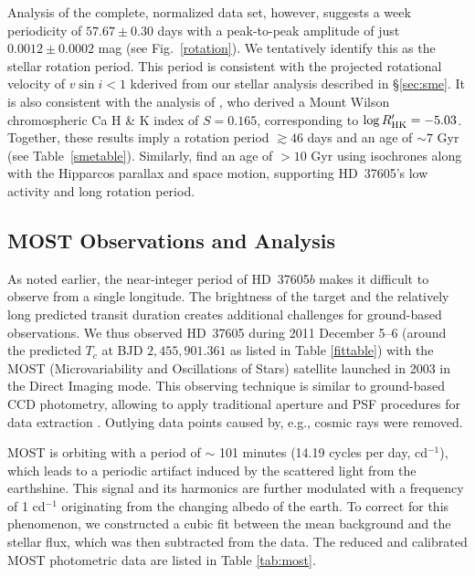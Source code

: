 Analysis of the complete, normalized data set, however, suggests a week 
periodicity of $57.67 \pm 0.30$ days with a peak-to-peak amplitude of just 
$0.0012 \pm 0.0002$ mag (see Fig.~\ref{rotation}).  We tentatively 
identify this as the stellar rotation period.  This period is consistent 
with the projected rotational velocity of $v\sin{i} < 1$ k\mps derived 
from our stellar analysis described in \S \ref{sec:sme}.  It is also 
consistent with the analysis of \cite{svalue2010}, who derived a Mount Wilson
chromospheric Ca {} H \& K index of $S=0.165$, corresponding to
$\log R^\prime_{\rm HK} = -5.03$.  Together, these results imply a
rotation period $\gtrsim 46$ days and an age of $\sim 7$ Gyr (see 
Table~\ref{smetable}).  Similarly, \cite{age2002} find an age of $> 10$ Gyr 
using isochrones along with the Hipparcos parallax and space motion, 
supporting HD~37605's low activity and long rotation period.



\subsection{MOST Observations and Analysis}\label{sec:most}


As noted earlier, the near-integer period of HD~37605$b$ makes it
difficult to observe from a single longitude. The brightness of the
target and the relatively long predicted transit duration creates
additional challenges for ground-based observations. We thus observed
HD~37605 during 2011 December 5--6 (around the predicted $T_c$ at BJD
$2,455,901.361$ as listed in Table \ref{fittable}) with the MOST
(Microvariability and Oscillations of Stars) satellite launched in
2003 \citep{2003PASP..115.1023W, 2004Natur.430...51M} in the Direct
Imaging mode. This observing technique is similar to ground-based CCD
photometry, allowing to apply traditional aperture and PSF procedures
for data extraction \citep[see e.g.][for
  details]{2006ApJ...646.1241R}. Outlying data points caused by, e.g.,
cosmic rays were removed.

MOST is orbiting with a period of $\sim$ 101 minutes (14.19
cycles per day, cd$^{-1}$), which leads to a periodic artifact induced by the
scattered light from the earthshine. This signal and its harmonics are
further modulated with a frequency of 1 cd$^{-1}$ originating from the
changing albedo of the earth. To correct for this phenomenon, we
constructed a cubic fit between the mean background and the stellar
flux, which was then subtracted from the data. The reduced and
calibrated MOST photometric data are listed in Table \ref{tab:most}.

